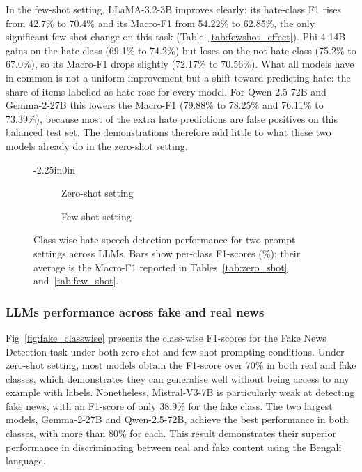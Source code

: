 \documentclass[10pt,letterpaper]{article}
\begin{document}
In the few-shot setting, LLaMA-3.2-3B improves clearly: its hate-class F1 rises from 42.7\% to 70.4\% and its Macro-F1 from 54.22\% to 62.85\%, the only significant few-shot change on this task (Table~\ref{tab:fewshot_effect}). Phi-4-14B gains on the hate class (69.1\% to 74.2\%) but loses on the not-hate class (75.2\% to 67.0\%), so its Macro-F1 drops slightly (72.17\% to 70.56\%). What all models have in common is not a uniform improvement but a shift toward predicting hate: the share of items labelled as hate rose for every model. For Qwen-2.5-72B and Gemma-2-27B this lowers the Macro-F1 (79.88\% to 78.25\% and 76.11\% to 73.39\%), because most of the extra hate predictions are false positives on this balanced test set. The demonstrations therefore add little to what these two models already do in the zero-shot setting.

\begin{figure}[t]
\begin{adjustwidth}{-2.25in}{0in}
    \centering
    \begin{subfigure}{0.7\textwidth}
        \centering
        \caption{Zero-shot setting}
        \label{fig:hate_zero}
    \end{subfigure}
    \hfill
    \begin{subfigure}{0.7\textwidth}
        \centering
        \caption{Few-shot setting}
        \label{fig:hate_few}
    \end{subfigure}
    \caption{Class-wise hate speech detection performance for two prompt settings across LLMs. Bars show per-class F1-scores (\%); their average is the Macro-F1 reported in Tables~\ref{tab:zero_shot} and~\ref{tab:few_shot}.}
    \label{fig:hate_classwise}
\end{adjustwidth}
\end{figure}


\subsubsection*{LLMs performance across fake and real news}
\label{sec:fake_classwise}

Fig~\ref{fig:fake_classwise} presents the class-wise F1-scores for the Fake News Detection task under both zero-shot and few-shot prompting conditions. Under zero-shot setting, most models obtain the F1-score over 70\% in both real and fake classes, which demonstrates they can generalise well without being access to any example with labels. Nonetheless, Mistral-V3-7B is particularly weak at detecting fake news, with an F1-score of only 38.9\% for the fake class. The two largest models, Gemma-2-27B and Qwen-2.5-72B, achieve the best performance in both classes, with more than 80\% for each. This result demonstrates their superior performance in discriminating between real and fake content using the Bengali language.
\end{document}
